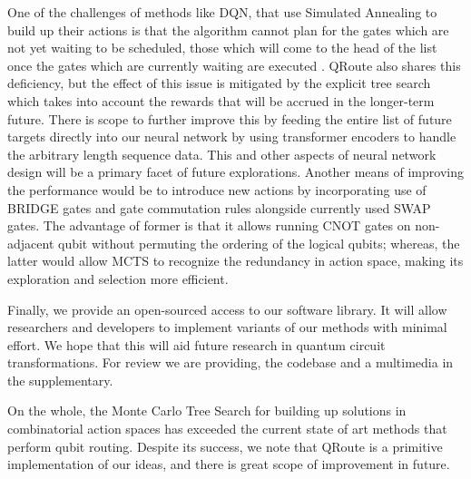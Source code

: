 One of the challenges of methods like DQN, that use Simulated Annealing to build up their actions is that the algorithm cannot plan for the gates which are not yet waiting to be scheduled, those which will come to the head of the list once the gates which are currently waiting are executed \cite{qroute_dqn2}. QRoute also shares this deficiency, but the effect of this issue is mitigated by the explicit tree search which takes into account the rewards that will be accrued in the longer-term future. There is scope to further improve this by feeding the entire list of future targets directly into our neural network by using transformer encoders to handle the arbitrary length sequence data. This and other aspects of neural network design will be a primary facet of future explorations. Another means of improving the performance  would be to introduce new actions by incorporating use of BRIDGE gates \cite{bridge_gate} and gate commutation rules \cite{utk_equiv_circuits} alongside currently used SWAP gates. The advantage of former is that it allows running CNOT gates on non-adjacent qubit without permuting the ordering of the logical qubits; whereas, the latter would allow MCTS to recognize the redundancy in action space, making its exploration and selection more efficient.

Finally, we provide an open-sourced access to our software library. It will allow researchers and developers to implement variants of our methods with minimal effort. We hope that this will aid future research in quantum circuit transformations. For review we are providing, the codebase and a multimedia in the supplementary.  

On the whole, the Monte Carlo Tree Search for building up solutions in combinatorial action spaces has exceeded the current state of art methods that perform qubit routing. Despite its success, we note that QRoute is a primitive implementation of our ideas, and there is great scope of improvement in future. 
